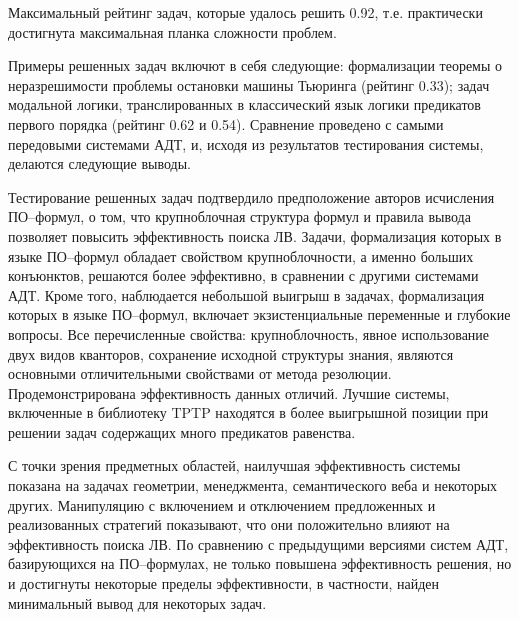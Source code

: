 \documentclass[a4paper]{report}
\begin{document}


Максимальный рейтинг задач, которые удалось решить 0.92, т.е. практически достигнута максимальная планка сложности проблем.

Примеры решенных задач включют в себя следующие: формализации теоремы о неразрешимости проблемы остановки машины Тьюринга (рейтинг 0.33); задач модальной логики, транслированных в классический язык логики предикатов первого порядка (рейтинг 0.62 и 0.54). Сравнение проведено с самыми передовыми системами АДТ, и, исходя из результатов тестирования системы, делаются следующие выводы.

Тестирование решенных задач подтвердило предположение авторов исчисления ПО--формул, о том, что крупноблочная структура формул и правила вывода позволяет повысить эффективность поиска ЛВ. Задачи, формализация которых в языке ПО--формул обладает свойством крупноблочности, а именно больших конъюнктов, решаются более эффективно, в сравнении с другими системами АДТ. Кроме того, наблюдается небольшой выигрыш в задачах, формализация которых в языке ПО--формул, включает экзистенциальные переменные и глубокие вопросы. Все перечисленные свойства: крупноблочность, явное использование двух видов кванторов, сохранение исходной структуры знания, являются основными отличительными свойствами от метода резолюции. Продемонстрирована эффективность данных отличий. Лучшие системы, включенные в библиотеку TPTP находятся в более выигрышной позиции при решении задач содержащих много предикатов равенства.

С точки зрения предметных областей, наилучшая эффективность системы показана на задачах геометрии, менеджмента, семантического веба и некоторых других. Манипуляцию с включением и отключением предложенных и реализованных стратегий показывают, что они положительно влияют на эффективность поиска ЛВ. По сравнению с предыдущими версиями систем АДТ, базирующихся на ПО--формулах, не только повышена эффективность решения, но и достигнуты некоторые пределы эффективности, в частности, найден минимальный вывод для некоторых задач.
\end{document}

